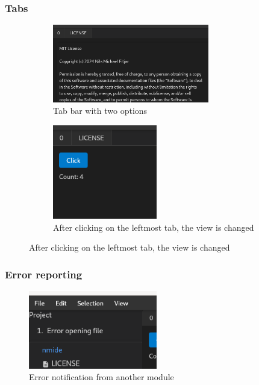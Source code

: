 \begin{frame}
  \frametitle{Tabs}
  \begin{figure}[H]
    \begin{subfigure}[h]{0.45\textwidth}
    \centering
    \includegraphics[width=0.75\textwidth]{./pics/tabs.png}
    \caption{
      Tab bar with two options
    }
    \end{subfigure}
    \hfill
    \begin{subfigure}[h]{0.45\textwidth}
    \centering
    \includegraphics[width=0.5\textwidth]{./pics/tab-switch.png}
    \caption{
      After clicking on the leftmost tab, the view is changed
    }
    \end{subfigure}
  \end{figure}
\end{frame}

\begin{frame}
  \frametitle{Error reporting}
  \begin{figure}
    \centering
    \includegraphics[width=0.5\textwidth]{./pics/errors.png}
    \caption{
      Error notification from another module
    }
  \end{figure}
\end{frame}

